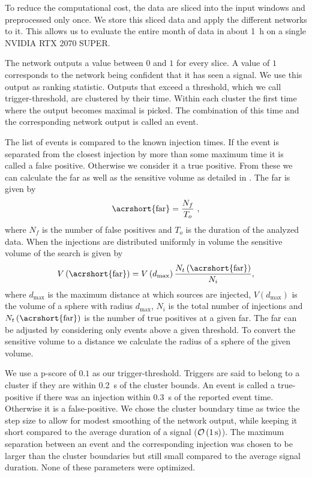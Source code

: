 To reduce the computational cost, the data are sliced into the input windows and preprocessed only once. We store this sliced data and apply the different networks to it. This allows us to evaluate the entire month of data in about \SI{1}{\hour} on a single NVIDIA RTX 2070 SUPER.

The network outputs a value between $0$ and $1$ for every slice. A value of $1$ corresponds to the network being confident that it has seen a signal. We use this output as ranking statistic. Outputs that exceed a threshold, which we call trigger-threshold, are clustered by their time. Within each cluster the first time where the output becomes maximal is picked. The combination of this time and the corresponding network output is called an event.

The list of events is compared to the known injection times. If the event is separated from the closest injection by more than some maximum time it is called a false positive. Otherwise we consider it a true positive. From these we can calculate the \acrshort{far} as well as the sensitive volume as detailed in \cite{Schafer:2020kor}. The \acrshort{far} is given by
\begin{equation}
    \text{\acrshort{far}} = \frac{N_f}{T_o} ~,
\end{equation}
where $N_f$ is the number of false positives and $T_o$ is the duration of the analyzed data. When the injections are distributed uniformly in volume the sensitive volume of the search is given by
\begin{equation}
    V\left(\text{\acrshort{far}}\right) = V\left(d_\text{max}\right)\frac{N_t\left(\text{\acrshort{far}}\right)}{N_i},
\end{equation}
where $d_\text{max}$ is the maximum distance at which sources are injected, $V\left(d_\text{max}\right)$ is the volume of a sphere with radius $d_\text{max}$, $N_i$ is the total number of injections and $N_t\left(\text{\acrshort{far}}\right)$ is the number of true positives at a given \acrshort{far}. The \acrshort{far} can be adjusted by considering only events above a given threshold. To convert the sensitive volume to a distance we calculate the radius of a sphere of the given volume.

We use a p-score of $0.1$ as our trigger-threshold. Triggers are said to belong to a cluster if they are within \SI{0.2}{\second} of the cluster bounds. An event is called a true-positive if there was an injection within \SI{0.3}{\second} of the reported event time. Otherwise it is a false-positive. We chose the cluster boundary time as twice the step size to allow for modest smoothing of the network output, while keeping it short compared to the average duration of a signal ($\mathcal{O}\left(\text{\SI{1}{\second}}\right)$). The maximum separation between an event and the corresponding injection was chosen to be larger than the cluster boundaries but still small compared to the average signal duration. None of these parameters were optimized.


